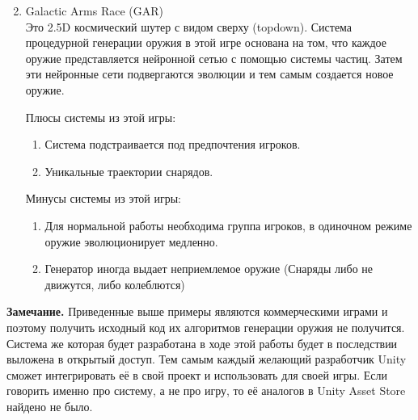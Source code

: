 \begin{enumerate}
    \setcounter{enumi}{1}
    \item Galactic Arms Race (GAR)\cite{s15}\\ Это 2.5D космический шутер с видом сверху (topdown). Система процедурной генерации оружия в этой игре основана на том, что каждое оружие представляется нейронной сетью с помощью системы частиц. Затем эти нейронные сети подвергаются эволюции и тем самым создается новое оружие.
    
    Плюсы системы из этой игры:
    \begin{enumerate}[--]
        \item Система подстраивается под предпочтения игроков.
        \item Уникальные траектории снарядов.
    \end{enumerate}

    Минусы системы из этой игры:
    \begin{enumerate}[--]
        \item Для нормальной работы необходима группа игроков, в одиночном режиме оружие эволюционирует медленно.
        \item Генератор иногда выдает неприемлемое оружие (Снаряды либо не движутся, либо колеблются)
    \end{enumerate}
\end{enumerate}

\textbf{Замечание.} Приведенные выше примеры являются коммерческими играми и поэтому получить исходный код их алгоритмов генерации оружия не получится. Система же которая будет разработана в ходе этой работы будет в последствии выложена в открытый доступ. Тем самым каждый желающий разработчик Unity сможет интегрировать её в свой проект и использовать для своей игры. Если говорить именно про систему, а не про игру, то её аналогов в Unity Asset Store найдено не было.




